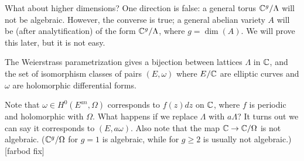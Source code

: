 What about higher dimensions? One direction is false: a general torus ${\mathbb C}^g/\Lambda$ will not be algebraic. However, the converse is true; a general abelian variety $A$ will be (after analytification) of the form ${\mathbb C}^g/\Lambda$, where $g=\dim(A)$. We will prove this later, but it is not easy. 

\begin{theorem}
The Weierstrass parametrization gives a bijection between lattices $\Lambda$ in ${\mathbb C}$, and the set of isomorphism classes of pairs $(E,\omega)$ where $E/{\mathbb C}$ are elliptic curves and $\omega$ are holomorphic differential forms. 
\end{theorem}

Note that $\omega\in H^0(E^{an},\Omega)$ corresponds to $f(z)dz$ on ${\mathbb C}$, where $f$ is periodic and holomorphic with $\Omega$. What happens if we replace $\Lambda$ with $a\Lambda$? It turns out we can say it corresponds to $(E,a\omega)$.
Also note that the map ${\mathbb C}\to {\mathbb C}/\Omega$ is not algebraic. (${\mathbb C}^g/\Omega$ for $g=1$ is algebraic, while for $g\geq 2$ is usually not algebraic.) [farbod fix]
